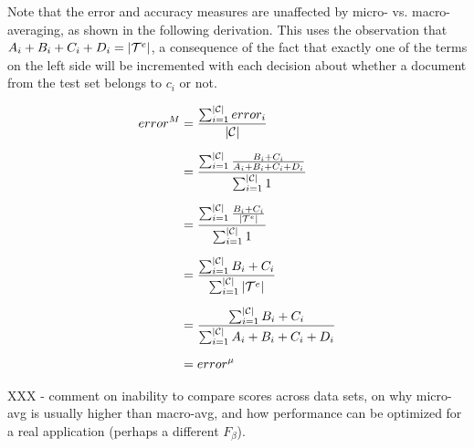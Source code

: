 Note that the error and accuracy measures are unaffected by micro-
vs. macro-averaging, as shown in the following derivation.  This uses
the observation that $A_i+B_i+C_i+D_i = |\mathcal{T}^e|$, a consequence of the
fact that exactly one of the terms on the left side will be
incremented with each decision about whether a document from the test
set belongs to $c_i$ or not.

\begin{equation*}
\begin{split}
error^M
 & = \frac{\sum_{i=1}^{|\mathcal{C}|}{error_i}}  {|\mathcal{C}|} \\[6pt]
 & = \frac{\sum_{i=1}^{|\mathcal{C}|}{ \frac{B_i+C_i}{A_i+B_i+C_i+D_i} }} { \sum_{i=1}^{|\mathcal{C}|}{1} } \\[6pt]
 & = \frac{\sum_{i=1}^{|\mathcal{C}|}{ \frac{B_i+C_i}{|\mathcal{T}^e|} }}         { \sum_{i=1}^{|\mathcal{C}|}{1} } \\[6pt]
 & = \frac{\sum_{i=1}^{|\mathcal{C}|}{B_i+C_i}}                           { \sum_{i=1}^{|\mathcal{C}|}{|\mathcal{T}^e|} } \\[6pt]
 & = \frac{\sum_{i=1}^{|\mathcal{C}|}{B_i+C_i}}                           { \sum_{i=1}^{|\mathcal{C}|}{A_i+B_i+C_i+D_i} } \\[6pt]
 & = error^\mu
\end{split}
\end{equation*}


XXX - comment on inability to compare scores across data sets, on why
micro-avg is usually higher than macro-avg, and how performance can be
optimized for a real application (perhaps a different $F_\beta$).